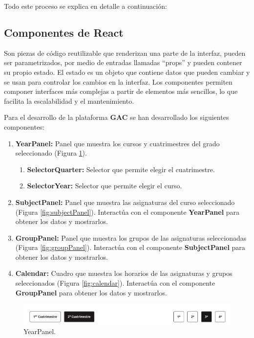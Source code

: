 Todo este proceso se explica en detalle a continuación:\newline

\subsection{Componentes de React}

Son piezas de código reutilizable que renderizan una parte de la interfaz, pueden ser parametrizados, por medio de entradas llamadas ``props'' y pueden contener su propio estado. El estado es un objeto que contiene datos que pueden cambiar y se usan para controlar los cambios en la interfaz. Los componentes permiten componer interfaces más complejas a partir de elementos más sencillos, lo que facilita la escalabilidad y el mantenimiento.\newline


Para el desarrollo de la plataforma \textbf{GAC} se han desarrollado los siguientes componentes:

\begin{enumerate}
    \item \textbf{YearPanel:} Panel que muestra los cursos y cuatrimestres del grado seleccionado (Figura \ref{fig:yearpanel}).
    \begin{enumerate}
        \item \textbf{SelectorQuarter:} Selector que permite elegir el cuatrimestre.
        \item \textbf{SelectorYear:} Selector que permite elegir el curso.
    \end{enumerate}
    \item \textbf{SubjectPanel:} Panel que muestra las asignaturas del curso seleccionado (Figura \ref{fig:subjectPanel}). Interactúa con el componente \textbf{YearPanel} para obtener los datos y mostrarlos.
    \item \textbf{GroupPanel:} Panel que muestra los grupos de las asignaturas seleccionadas (Figura \ref{fig:groupPanel}). Interactúa con el componente \textbf{SubjectPanel} para obtener los datos y mostrarlos.
    \item \textbf{Calendar:} Cuadro que muestra los horarios de las asignaturas y grupos seleccionados (Figura \ref{fig:calendar}). Interactúa con el componente \textbf{GroupPanel} para obtener los datos y mostrarlos.
\end{enumerate}

\begin{figure}[H]
    \centering
    \includegraphics[width=1\textwidth]{./imagenes/year_panel.png}
    \caption{YearPanel.}
    \label{fig:yearpanel}
\end{figure}

